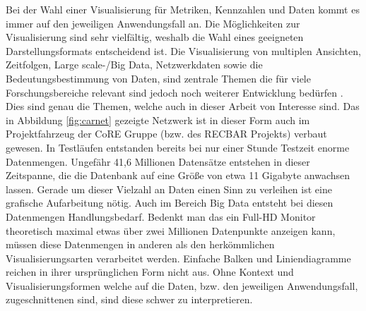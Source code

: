 \documentclass[draft=false
              ,paper=a4
              ,twoside=false
              ,fontsize=11pt
              ,headsepline
              ,BCOR10mm
              ,DIV11
              ]{scrbook}
\begin{document}
Bei der Wahl einer Visualisierung für Metriken, Kennzahlen und Daten kommt es immer auf den jeweiligen Anwendungsfall an. Die Möglichkeiten zur Visualisierung sind sehr vielfältig, weshalb die Wahl eines geeigneten Darstellungsformats entscheidend ist. Die Visualisierung von multiplen Ansichten, Zeitfolgen, Large scale-/Big Data, Netzwerkdaten sowie die Bedeutungsbestimmung von Daten, sind zentrale Themen die für viele Forschungsbereiche relevant sind jedoch noch weiterer Entwicklung bedürfen \cite{isenberg_toward_2014}. Dies sind genau die Themen, welche auch in dieser Arbeit von Interesse sind. Das in Abbildung \ref{fig:carnet}  gezeigte Netzwerk ist in dieser Form auch im Projektfahrzeug der CoRE Gruppe \cite{core_2017} (bzw. des RECBAR Projekts) verbaut gewesen. In Testläufen entstanden bereits bei nur einer Stunde Testzeit enorme Datenmengen. Ungefähr 41,6 Millionen Datensätze entstehen in dieser Zeitspanne, die die Datenbank auf eine Größe von etwa 11 Gigabyte anwachsen lassen. Gerade um dieser Vielzahl an Daten einen Sinn zu verleihen ist eine grafische Aufarbeitung nötig. Auch im Bereich Big Data entsteht bei diesen Datenmengen Handlungsbedarf. Bedenkt man das ein Full-HD Monitor theoretisch maximal etwas über zwei Millionen Datenpunkte anzeigen kann, müssen diese Datenmengen in anderen als den herkömmlichen Visualisierungsarten verarbeitet werden. Einfache Balken und Liniendiagramme reichen in ihrer ursprünglichen Form nicht aus. Ohne Kontext und Visualisierungsformen welche auf die Daten, bzw. den jeweiligen Anwendungsfall, zugeschnittenen sind, sind diese schwer zu interpretieren.
\end{document}
